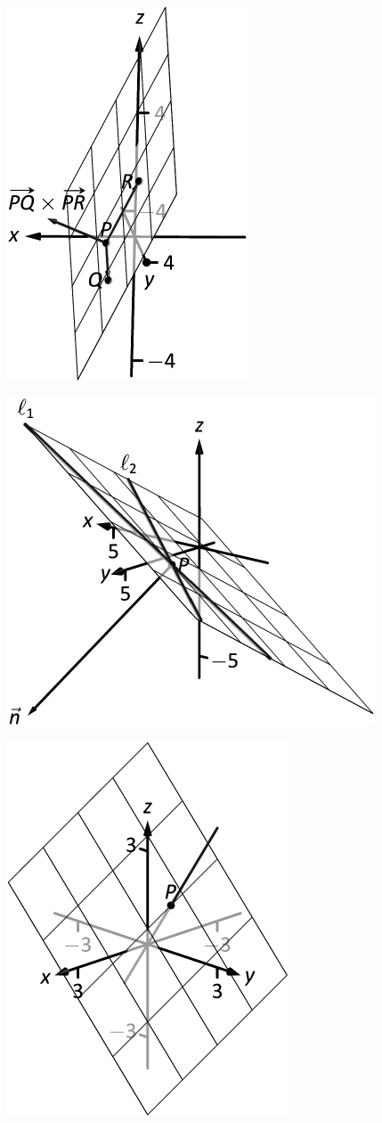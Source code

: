 \documentclass[10pt]{article}
\begin{document}
\includegraphics{figplanes1_3DBW.pdf}
\texttt{}

\includegraphics{figplanes2_3DBW.pdf}
\texttt{}

\includegraphics{figplanes3_3DBW.pdf}
\texttt{}
\end{document}
